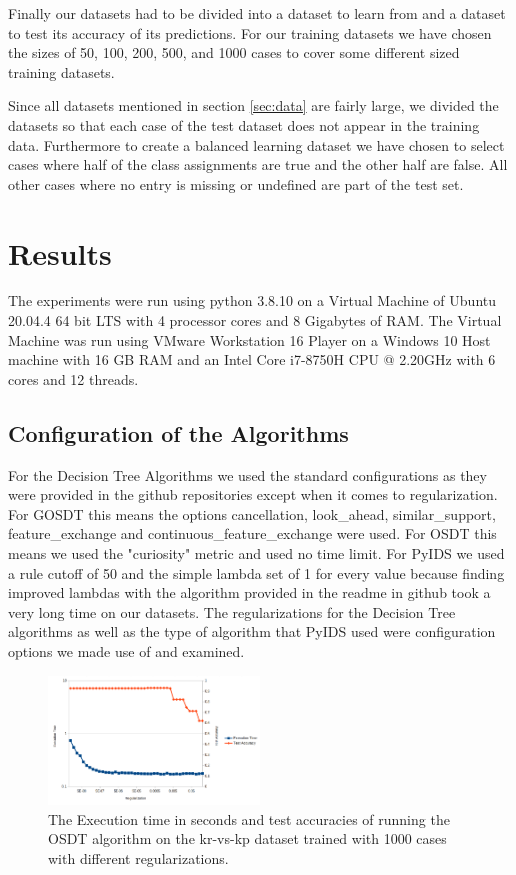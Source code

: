 \documentclass[a4paper,preprint]{sig-alternate-xt}
\begin{document}
Finally our datasets had to be divided into a dataset to learn from and a dataset to test its accuracy of its predictions.
For our training datasets we have chosen the sizes of 50, 100, 200, 500, and 1000 cases to cover some different sized training datasets.

Since all datasets mentioned in section \ref{sec:data} are fairly large, we  divided the datasets so that each case of the test dataset does not appear in the training data.
Furthermore to create a balanced learning dataset we have chosen to select cases where half of the class assignments are true and the other half are false. All other cases where no entry is missing or undefined are part of the test set.

\section{Results}
\label{sec:eval}

The experiments were run using python 3.8.10 on a Virtual Machine of Ubuntu 20.04.4 64 bit LTS with 4 processor cores and 8 Gigabytes of RAM. The Virtual Machine was run using VMware Workstation 16 Player on a Windows 10 Host machine with 16 GB RAM and an Intel Core i7-8750H CPU @ 2.20GHz with 6 cores and 12 threads. 

\subsection{Configuration of the Algorithms}
\label{subsec:conf}

For the Decision Tree Algorithms we used the standard configurations as they were provided in the github repositories except when it comes to regularization. For GOSDT this means the options cancellation, look\_ahead, similar\_support, feature\_exchange and continuous\_feature\_exchange were used. For OSDT this means we used the "curiosity" metric and used no time limit. For PyIDS we used a rule cutoff of 50 and the simple lambda set of 1 for every value because finding improved lambdas with the algorithm provided in the readme in github took a very long time on our datasets. The regularizations for the Decision Tree algorithms as well as the type of algorithm that PyIDS used were configuration options we made use of and examined. 



\begin{figure}[h]
    \centering
    \includegraphics[width=0.5\textwidth]{regtest_osdt.png}
    \caption{The Execution time in seconds and test accuracies of running the OSDT algorithm on the kr-vs-kp dataset trained with 1000 cases with different regularizations.}
    \label{fig:reg1}
\end{figure}
\end{document}
